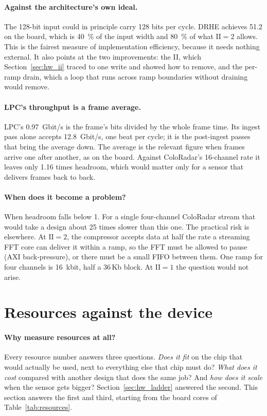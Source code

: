 \paragraph{Against the architecture's own ideal.} The 128-bit input could in
principle carry 128 bits per cycle. DRHE achieves 51.2 on the board, which is
\SI{40}{\percent} of the input width and \SI{80}{\percent} of what
$\mathrm{II} = 2$ allows. This is the fairest measure of implementation
efficiency, because it needs nothing external. It also points at the two
improvements: the II, which Section~\ref{sec:hw_ii} traced to one write and
showed how to remove, and the per-ramp drain, which a loop that runs across
ramp boundaries without draining would remove.

\paragraph{LPC's throughput is a frame average.} LPC's \SI{0.97}{Gbit/s} is the
frame's bits divided by the whole frame time. Its ingest pass alone accepts
\SI{12.8}{Gbit/s}, one beat per cycle; it is the post-ingest passes that bring
the average down. The average is the relevant figure when frames arrive one
after another, as on the board. Against ColoRadar's 16-channel rate it leaves
only 1.16 times headroom, which would matter only for a sensor that delivers
frames back to back.

\paragraph{When does it become a problem?} When headroom falls below 1. For a
single four-channel ColoRadar stream that would take a design about 25 times
slower than this one. The practical risk is elsewhere. At $\mathrm{II} = 2$, the
compressor accepts data at half the rate a streaming FFT core can deliver it
within a ramp, so the FFT must be allowed to pause (AXI back-pressure), or there
must be a small FIFO between them. One ramp for four channels is
\SI{16}{\kilo bit}, half a 36\,Kb block. At $\mathrm{II} = 1$ the question would
not arise.

\section{Resources against the device}
\label{sec:hw_resources}

\paragraph{Why measure resources at all?} Every resource number answers three
questions. \emph{Does it fit} on the chip that would actually be used, next to
everything else that chip must do? \emph{What does it cost} compared with
another design that does the same job? And \emph{how does it scale} when the
sensor gets bigger? Section~\ref{sec:hw_ladder} answered the second. This
section answers the first and third, starting from the board cores of
Table~\ref{tab:resources}.

